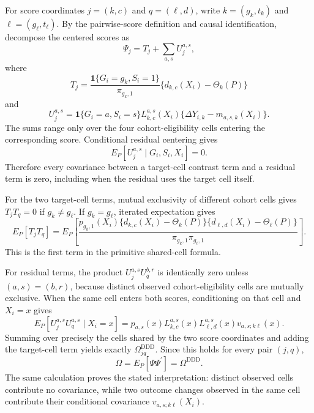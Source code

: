 For score coordinates \(j=(k,c)\) and \(q=(\ell,d)\), write \(k=(g_k,t_k)\) and \(\ell=(g_\ell,t_\ell)\). By the pairwise-score definition and causal identification, decompose the centered scores as
\[
 \Psi_j=T_j+\sum_{a,s}U_j^{a,s},
\]
where
\[
 T_j=\frac{\mathbf 1\{G_i=g_k,S_i=1\}}{\pi_{g_k,1}}
       \{d_{k,c}(X_i)-\Theta_k(P)\}
\]
and
\[
 U_j^{a,s}=\mathbf 1\{G_i=a,S_i=s\}L_{k,c}^{a,s}(X_i)
       \{\Delta Y_{i,k}-m_{a,s,k}(X_i)\}.
\]
The sums range only over the four cohort-eligibility cells entering the corresponding score. Conditional residual centering gives
\[
 E_P[U_j^{a,s}\mid G_i,S_i,X_i]=0.
\]
Therefore every covariance between a target-cell contrast term and a residual term is zero, including when the residual uses the target cell itself.

For the two target-cell terms, mutual exclusivity of different cohort cells gives \(T_jT_q=0\) if \(g_k\ne g_\ell\). If \(g_k=g_\ell\), iterated expectation gives
\[
 E_P[T_jT_q]
 =E_P\!\left[
 \frac{p_{g_k,1}(X_i)
 \{d_{k,c}(X_i)-\Theta_k(P)\}
 \{d_{\ell,d}(X_i)-\Theta_\ell(P)\}}
 {\pi_{g_k,1}\pi_{g_\ell,1}}
 \right].
\]
This is the first term in the primitive shared-cell formula.

For residual terms, the product \(U_j^{a,s}U_q^{b,r}\) is identically zero unless \((a,s)=(b,r)\), because distinct observed cohort-eligibility cells are mutually exclusive. When the same cell enters both scores, conditioning on that cell and \(X_i=x\) gives
\[
 E_P[U_j^{a,s}U_q^{a,s}\mid X_i=x]
 =p_{a,s}(x)L_{k,c}^{a,s}(x)L_{\ell,d}^{a,s}(x)
   v_{a,s;k\ell}(x).
\]
Summing over precisely the cells shared by the two score coordinates and adding the target-cell term yields exactly \(\Omega^{\mathrm{DDD}}_{jq}\). Since this holds for every pair \((j,q)\),
\[
 \Omega=E_P[\Psi\Psi^{\prime}]=\Omega^{\mathrm{DDD}}.
\]
The same calculation proves the stated interpretation: distinct observed cells contribute no covariance, while two outcome changes observed in the same cell contribute their conditional covariance \(v_{a,s;k\ell}(X_i)\).